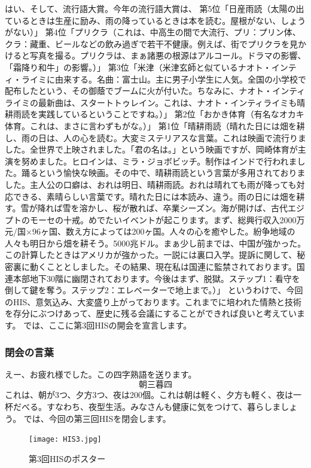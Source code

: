 はい、そして、流行語大賞。今年の流行語大賞は、
第5位「日産雨読（太陽の出ているときは生産に励み、雨の降っているときは本を読む。屋根がない、しょうがない）」
第4位「プリクラ（これは、中高生の間で大流行、プリ：プリン体、クラ：藏重、ビールなどの飲み過ぎで若干不健康。例えば、街でプリクラを見かけると写真を撮る。プリクラは、まぁ諸悪の根源はアルコール。ドラマの影響、「霜降り和牛」の影響。）」
第3位「米津（米津玄師と似ているナオト・インティ・ライミに由来する。名曲：富士山。主に男子小学生に人気。全国の小学校で配布したという、その御蔭でブームに火が付いた。ちなみに、ナオト・インティライミの最新曲は、スタートトゥレイン。これは、ナオト・インティライミも晴耕雨読を実践しているということですね。）」
第2位「おかき体育（有名なオカキ体育。これは、まさに言わずもがな。）」
第1位「晴耕雨読（晴れた日には畑を耕し、雨の日は、人の心を読む。大変ミステリアスな言葉。これは映画で流行りました。全世界で上映されました。「君の名は。」という映画ですが、岡崎体育が主演を努めました。ヒロインは、ミラ・ジョボビッチ。制作はインドで行われました。踊るという愉快な映画。その中で、晴耕雨読という言葉が多用されておりました。主人公の口癖は、おれは明日、晴耕雨読。おれは晴れても雨が降っても対応できる、素晴らしい言葉です。晴れた日には本読み、違う。雨の日には畑を耕す。雪が降れば雪を溶かし、桜が散れば、卒業シーズン。海が開けば、古代エジプトのモーセの十戒。めでたいイベントが起こります。まず、総興行収入2000万元/国×96ヶ国、数え方によっては200ヶ国。人々の心を癒やした。紛争地域の人々も明日から畑を耕そう。5000兆ドル。まぁ少し前までは、中国が強かった。この計算したときはアメリカが強かった。一説には裏口入学。提訴に関して、秘密裏に動くこととしました。その結果、現在私は国連に監禁されております。国連本部地下30階に幽閉されております。今後はまず、脱獄。ステップ1：看守を倒して鍵を奪う。ステップ2：エレベーターで地上まで。）」
というわけで、今回のHIS、意気込み、大変盛り上がっております。これまでに培われた情熱と技術を存分にぶつけあって、歴史に残る会議にすることができれば良いと考えています。
では、ここに第3回HISの開会を宣言します。

\subsubsection{閉会の言葉}
えー、お疲れ様でした。この四字熟語を送ります。
\[
朝三暮四
\]
これは、朝が3つ、夕方3つ、夜は200個。これは朝は軽く、夕方も軽く、夜は一杯だべる。すなわち、夜型生活。みなさんも健康に気をつけて、暮らしましょう。
では、今回の第三回HISを閉会します。

\begin{figure}[H]
\centering
\texttt{[image: HIS3.jpg]}
\caption{第3回HISのポスター}
\label{HIS3}
\end{figure}

